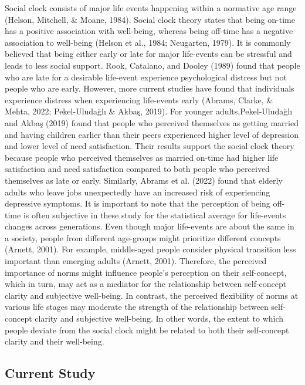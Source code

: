 \documentclass[
  man,floatsintext]{apa6}
\begin{document}
Social clock consists of major life events happening within a normative age range (Helson, Mitchell, \& Moane, 1984). Social clock theory states that being on-time has a positive association with well-being, whereas being off-time has a negative association to well-being (Helson et al., 1984; Neugarten, 1979). It is commonly believed that being either early or late for major life-events can be stressful and leads to less social support.
Rook, Catalano, and Dooley (1989) found that people who are late for a desirable life-event experience psychological distress but not people who are early. However, more current studies have found that individuals experience distress when experiencing life-events early (Abrams, Clarke, \& Mehta, 2022; Pekel-Uludağlı \& Akbaş, 2019). For younger adults,Pekel-Uludağlı and Akbaş (2019) found that people who perceived themselves as getting married and having children earlier than their peers experienced higher level of depression and lower level of need satisfaction. Their results support the social clock theory because people who perceived themselves as married on-time had higher life satisfaction and need satisfaction compared to both people who perceived themselves as late or early. Similarly, Abrams et al. (2022) found that elderly adults who leave jobs unexpectedly have an increased risk of experiencing depressive symptoms. It is important to note that the perception of being off-time is often subjective in these study for the statistical average for life-events changes across generations.
Even though major life-events are about the same in a society, people from different age-groups might prioritize different concepts (Arnett, 2001). For example, middle-aged people consider physical transition less important than emerging adults (Arnett, 2001). Therefore, the perceived importance of norms might influence people's perception on their self-concept, which in turn, may act as a mediator for the relationship between self-concept clarity and subjective well-being. In contrast, the perceived flexibility of norms at various life stages may moderate the strength of the relationship between self-concept clarity and subjective well-being. In other words, the extent to which people deviate from the social clock might be related to both their self-concept clarity and their well-being.

\hypertarget{current-study}{%
\subsection{Current Study}\label{current-study}}
\end{document}
